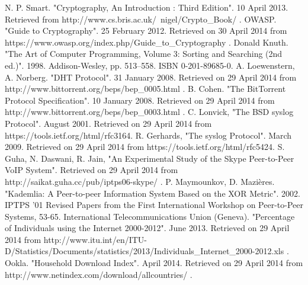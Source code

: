 \documentclass[12pt]{report}
\begin{document}
\begin{thebibliography}{11}
 N. P. Smart. "Cryptography, An Introduction : Third Edition". 10 April 2013. Retrieved from http://www.cs.bris.ac.uk/~nigel/Crypto\_Book/ .
 OWASP. "Guide to Cryptography". 25 February 2012. Retrieved on 30 April 2014 from https://www.owasp.org/index.php/Guide\_to\_Cryptography .
 Donald Knuth. "The Art of Computer Programming, Volume 3: Sorting and Searching (2nd ed.)". 1998. Addison-Wesley, pp. 513–558. ISBN 0-201-89685-0.
 A. Loewenstern, A. Norberg. "DHT Protocol". 31 January 2008. Retrieved on 29 April 2014 from http://www.bittorrent.org/beps/bep\_0005.html .
 B. Cohen. "The BitTorrent Protocol Specification". 10 January 2008. Retrieved on 29 April 2014 from http://www.bittorrent.org/beps/bep\_0003.html .
 C. Lonvick, "The BSD syslog Protocol". August 2001. Retrieved on 29 April 2014 from https://tools.ietf.org/html/rfc3164.
 R. Gerhards, "The syslog Protocol". March 2009. Retrieved on 29 April 2014 from https://tools.ietf.org/html/rfc5424.
 S. Guha, N. Daswani, R. Jain, "An Experimental Study of the Skype Peer-to-Peer VoIP System". Retrieved on 29 April 2014 from http://saikat.guha.cc/pub/iptps06-skype/ .
 P. Maymounkov, D. Mazi\`eres. "Kademlia: A Peer-to-peer Information System Based on the XOR Metric". 2002. IPTPS '01 Revised Papers from the First International Workshop on Peer-to-Peer Systems, 53-65.
 International Telecommunications Union (Geneva). "Percentage of Individuals using the Internet 2000-2012". June 2013. Retrieved on 29 April 2014 from http://www.itu.int/en/ITU-D/Statistics/Documents/statistics/2013/Individuals\_Internet\_2000-2012.xls .
 Ookla. "Household Download Index". April 2014. Retrieved on 29 April 2014 from http://www.netindex.com/download/allcountries/ .

\end{thebibliography}
\end{document}
